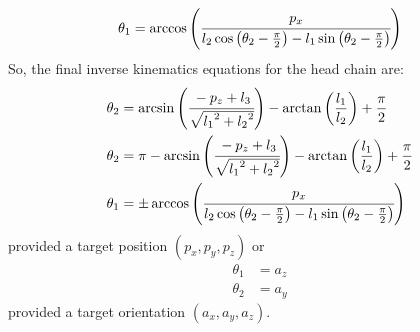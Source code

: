 \[
\theta_1 = \arccos\left(\cfrac{p_x}{l_2\cos\left(\theta_2 - \frac{\pi}{2}\right) - l_1\sin\left(\theta_2 - \frac{\pi}{2}\right) } \right)
\]
So, the final inverse kinematics equations for the head chain are:
\begin{align*}
\theta_2 &= \arcsin\left(\cfrac{- p_z + l_3}{ \sqrt{{l_1}^2+{l_2}^2} }\right) - \arctan\left(\frac{l_1}{l_2}\right) + \frac{\pi}{2}\\
\theta_2 &= \pi - \arcsin\left(\cfrac{- p_z + l_3}{ \sqrt{{l_1}^2+{l_2}^2} }\right) - \arctan\left(\frac{l_1}{l_2}\right) + \frac{\pi}{2}\\
\theta_1 &= \pm\arccos\left(\cfrac{p_x}{l_2\cos\left(\theta_2 - \frac{\pi}{2}\right) - l_1\sin\left(\theta_2 - \frac{\pi}{2}\right) } \right)
\end{align*}
provided a target position $(p_x,p_y,p_z)$ or 
\begin{align*}
\theta_1 &= a_z\\
\theta_2 &= a_y
\end{align*}
provided a target orientation $(a_x,a_y,a_z)$.

